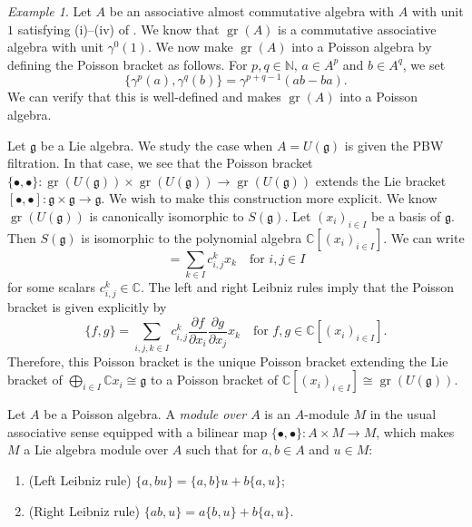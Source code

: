 \documentclass[a4paper, 12pt, reqno]{amsart}
\theoremstyle{remark}
\newtheorem{example}[theorem]{Example}
\DeclareMathOperator{\gr}{gr}
\begin{document}
\begin{example}
  \label{exa:19}
  Let $A$ be an associative almost commutative algebra with $A$ with unit $1$ satisfying (i)--(iv) of .
  We know that $\gr(A)$ is a commutative associative algebra with unit $\gamma^0(1)$.
  We now make $\gr(A)$ into a Poisson algebra by defining the Poisson bracket as follows.
  For $p, q \in \mathbb{N}$, $a \in A^p$ and $b \in A^q$, we set
  \begin{equation*}
    \{\gamma^p(a), \gamma^q(b)\} = \gamma^{p + q - 1}(ab - ba).
  \end{equation*}
  We can verify that this is well-defined and makes $\gr(A)$ into a Poisson algebra.

  Let $\mathfrak{g}$ be a Lie algebra.
  We study the case when $A = U(\mathfrak{g})$ is given the PBW filtration.
  In that case, we see that the Poisson bracket $\{\bullet, \bullet\}: \gr(U(\mathfrak{g})) \times \gr(U(\mathfrak{g})) \to \gr(U(\mathfrak{g}))$ extends the Lie bracket $[\bullet, \bullet]: \mathfrak{g} \times \mathfrak{g} \to \mathfrak{g}$.
  We wish to make this construction more explicit.
  We know $\gr(U(\mathfrak{g}))$ is canonically isomorphic to $S(\mathfrak{g})$.
  Let $(x_i)_{i \in I}$ be a basis of $\mathfrak{g}$.
  Then $S(\mathfrak{g})$ is isomorphic to the polynomial algebra $\mathbb{C}[(x_i)_{i \in I}]$.
  We can write
  \begin{equation*}
    [x_i, x_j] = \sum_{k \in I}c^k_{i, j}x_k \quad \text{for $i, j \in I$}
  \end{equation*}
  for some scalars $c^k_{i, j} \in \mathbb{C}$.
  The left and right Leibniz rules imply that the Poisson bracket is given explicitly by
  \begin{equation*}
    \{f, g\} = \sum_{i, j, k \in I}c^k_{i, j}\frac{\partial f}{\partial x_i}\frac{\partial g}{\partial x_j}x_k \quad \text{for $f, g \in \mathbb{C}[(x_i)_{i \in I}]$}.
  \end{equation*}
  Therefore, this Poisson bracket is the unique Poisson bracket extending the Lie bracket of $\bigoplus_{i \in I}\mathbb{C}x_i \cong \mathfrak{g}$ to a Poisson bracket of $\mathbb{C}[(x_i)_{i \in I}] \cong \gr(U(\mathfrak{g}))$.
\end{example}

Let $A$ be a Poisson algebra.
A \emph{module over $A$} is an $A$-module $M$ in the usual associative sense equipped with a bilinear map $\{\bullet, \bullet\}: A \times M \to M$, which makes $M$ a Lie algebra module over $A$ such that for $a, b \in A$ and $u \in M$:
\begin{enumerate}
\item (Left Leibniz rule) $\{a, bu\} = \{a, b\}u + b\{a, u\}$;
\item (Right Leibniz rule) $\{ab, u\} = a\{b, u\} + b\{a, u\}$.
\end{enumerate}
\end{document}
